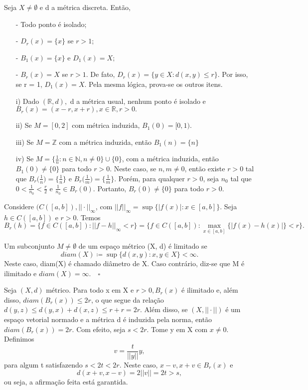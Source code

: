 \documentclass[MetricSpaces/metric_notes.tex]{subfiles}
\begin{document}
\begin{example}
	Seja \(X \neq\emptyset\) e d a métrica discreta. Então,
	\begin{itemize}
		\item[-] Todo ponto é isolado;
		\item[-] \(D_{r}(x) = \{x\}\) se \(r > 1\);
		\item[-] \(B_{1}(x) = \{x\}\) e \(D_{1}(x) = X;\)
		\item[-] \(B_{r}(x) = X\) se \(r > 1\).
		      De fato, \(D_{r}(x) = \{y\in X: d(x, y)\leq r\}.\) Por isso, se r = 1, \(D_{1}(x) = X.\) Pela mesma lógica, prova-se os outros itens.
	\end{itemize}
\end{example}
\begin{example}
	\begin{itemize}
		\item[i)] Dado \((\mathbb{R}, d),\) d a métrica usual, nenhum ponto é isolado e \(B_{r}(x) = (x-r, x+r), x\in \mathbb{R}, r > 0.\)
		\item[ii)] Se \(M=[0, 2]\) com métrica induzida, \(B_{1}(0) = [0, 1).\)
		\item[iii)] Se \(M=\mathbb{Z}\) com a métrica induzida, então \(B_{1}(n) = \{n\}\)
		\item[iv)] Se \(M=\{\frac{1}{n}:n\in \mathbb{N}, n\neq0\}\cup\{0\}\), com a métrica induzida, então \(B_{1}(0)\neq\{0\}\) para todo \(r>0.\)
		      Neste caso, se \(n, m\neq 0\), então existe \(r > 0\) tal que \(B_{r}\biggl(\frac{1}{n}\biggr)=\{\frac{1}{n}\}\) e \(B_{r}\biggl(\frac{1}{m}\biggr)=\{\frac{1}{m}\}.\) Porém,
		      para qualquer \(r> 0\), seja \(n_{0}\) tal que \(0 < \frac{1}{n_{0}} < \frac{r}{2}\) e \(\frac{1}{n_{0}}\in B_{r}(0).\) Portanto, \(B_{r}(0)\neq\{0\}\) para todo \(r> 0\).
	\end{itemize}
\end{example}
\begin{example}
	Considere \((C([a, b]), ||\cdot ||_{\infty}\), com \(||f||_{\infty} = \sup\{|f(x)|: x\in[a, b]\}.\) Seja
	\(h\in C([a, b])\) e \(r > 0\). Temos
	\[
		B_{r}(h) = \{f\in C([a, b]): ||f-h||_{\infty} < r\} = \{f\in C([a, b]):\max_{x\in[a, b]}\{|f(x)-h(x)|\} < r\}.
	\]
\end{example}
\begin{def*}
	Um subconjunto \(M \neq\emptyset\) de um espaço métrico (X, d) é limitado se
	\[
		diam(X)\coloneqq \sup\{d(x, y):x, y\in X\} < \infty.
	\]
	Neste caso, diam(X) é chamado diâmetro de X. Caso contrário, diz-se que M é ilimitado e \(diam(X) = \infty.\quad\square\)
\end{def*}
\begin{example}
	Seja \((X, d)\) métrico. Para todo x em X e \(r>0, B_{r}(x)\) é ilimitado e, além disso, \(diam(B_{r}(x))\leq 2r\), o que segue da relação
	\(d(y, z)\leq d(y, x) + d(x, z)\leq r + r = 2r.\) Além disso, se \((X, ||\cdot ||)\) é um espaço vetorial normado e a métrica d é induzida pela norma,
	então \(diam(B_{r}(x)) = 2r.\) Com efeito, seja \(s < 2r.\) Tome y em X com \(x\neq0.\) Definimos
	\[
		v = \frac{t}{||y||}y,
	\]
	para algum t satisfazendo \(s < 2t < 2r.\) Neste caso, \(x-v, x+v\in B_{r}(x)\)  e
	\[
		d(x+v, x-v) = 2||v|| = 2t > s,
	\]
	ou seja, a afirmação feita está garantida.
\end{example}
\end{document}
